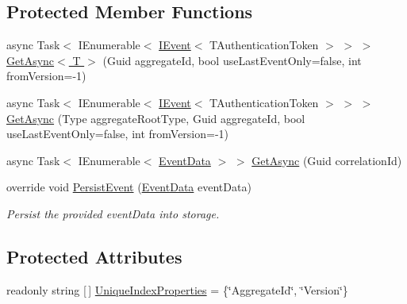 \subsection*{Protected Member Functions}
\begin{DoxyCompactItemize}
\item 
async Task$<$ I\+Enumerable$<$ \hyperlink{interfaceCqrs_1_1Events_1_1IEvent}{I\+Event}$<$ T\+Authentication\+Token $>$ $>$ $>$ \hyperlink{classCqrs_1_1Azure_1_1DocumentDb_1_1Events_1_1AzureDocumentDbEventStore_a2845015d6fda0d9e79b77b82d9452a4d_a2845015d6fda0d9e79b77b82d9452a4d}{Get\+Async$<$ T $>$} (Guid aggregate\+Id, bool use\+Last\+Event\+Only=false, int from\+Version=-\/1)
\item 
async Task$<$ I\+Enumerable$<$ \hyperlink{interfaceCqrs_1_1Events_1_1IEvent}{I\+Event}$<$ T\+Authentication\+Token $>$ $>$ $>$ \hyperlink{classCqrs_1_1Azure_1_1DocumentDb_1_1Events_1_1AzureDocumentDbEventStore_a8b481bf0b0f6b50184441965630f5443_a8b481bf0b0f6b50184441965630f5443}{Get\+Async} (Type aggregate\+Root\+Type, Guid aggregate\+Id, bool use\+Last\+Event\+Only=false, int from\+Version=-\/1)
\item 
async Task$<$ I\+Enumerable$<$ \hyperlink{classCqrs_1_1Events_1_1EventData}{Event\+Data} $>$ $>$ \hyperlink{classCqrs_1_1Azure_1_1DocumentDb_1_1Events_1_1AzureDocumentDbEventStore_ae44ea4b68f4794022b685bc380abbd04_ae44ea4b68f4794022b685bc380abbd04}{Get\+Async} (Guid correlation\+Id)
\item 
override void \hyperlink{classCqrs_1_1Azure_1_1DocumentDb_1_1Events_1_1AzureDocumentDbEventStore_afe494469614082cf667f5cf4b6c4a97b_afe494469614082cf667f5cf4b6c4a97b}{Persist\+Event} (\hyperlink{classCqrs_1_1Events_1_1EventData}{Event\+Data} event\+Data)
\begin{DoxyCompactList}\small\item\em Persist the provided {\itshape event\+Data}  into storage. \end{DoxyCompactList}\end{DoxyCompactItemize}
\subsection*{Protected Attributes}
\begin{DoxyCompactItemize}
\item 
readonly string \mbox{[}$\,$\mbox{]} \hyperlink{classCqrs_1_1Azure_1_1DocumentDb_1_1Events_1_1AzureDocumentDbEventStore_ab2a2b5dd046487edc33917983587d847_ab2a2b5dd046487edc33917983587d847}{Unique\+Index\+Properties} = \{\char`\"{}Aggregate\+Id\char`\"{}, \char`\"{}Version\char`\"{}\}
\end{DoxyCompactItemize}
